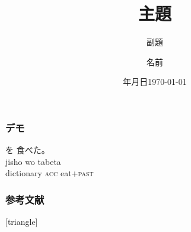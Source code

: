 \documentclass[11pt]{beamer}
\title{主題}
\subtitle{副題}
\institute{所属}
\author{名前}
\date{{\number\year}年{\number\month}月{\number\day}日}
\date{\today}
\newcommand{\maru}{。}
\begin{document}
\begin{frame}
    \nocite{demo}
    \maketitle
\end{frame}

\begin{frame}
\frametitle{デモ}
    \begin{exe}
        \ex%
         {を} {食べた\maru{}} \\
              {jisho} {wo} {tabeta} \\
              {dictionary} {\textsc{acc}} {eat+\textsc{past}} \\
    \end{exe}
\end{frame}

\begin{frame}[allowframebreaks]
\frametitle{参考文献}
\begingroup
\scriptsize
    [triangle]
    
    
\endgroup
\end{frame}
\end{document}
